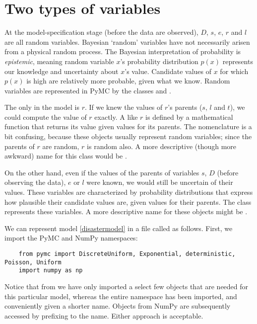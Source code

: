\section{Two types of variables}

At the model-specification stage (before the data are observed), $D$, $s$, $e$, $r$ and $l$ are all random variables. Bayesian `random' variables have not necessarily arisen from a physical random process. The Bayesian interpretation of probability is \emph{epistemic}, meaning random variable $x$'s probability distribution $p(x)$ represents our knowledge and uncertainty about $x$'s value. Candidate values of $x$ for which $p(x)$ is high are relatively more probable, given what we know. Random variables are represented in PyMC by the classes  and . 

The only  in the model is $r$. If we knew the values of $r$'s parents ($s$, $l$ and $t$), we could compute the value of $r$ exactly. A  like $r$ is defined by a mathematical function that returns its value given values for its parents. The nomenclature is a bit confusing, because these objects usually represent random variables; since the parents of $r$ are random, $r$ is random also. A more descriptive (though more awkward) name for this class would be .

On the other hand, even if the values of the parents of variables $s$, $D$ (before observing the data), $e$ or $l$ were known, we would still be uncertain of their values. These variables are characterized by probability distributions that express how plausible their candidate values are, given values for their parents. The  class represents these variables. A more descriptive name for these objects might be .

We can represent model \ref{disastermodel} in a file called  as follows. First, we import the PyMC and NumPy namespaces:
\begin{verbatim}
	from pymc import DiscreteUniform, Exponential, deterministic, Poisson, Uniform
	import numpy as np
\end{verbatim}
Notice that from  we have only imported a select few objects that are needed for this particular model, whereas the entire  namespace has been imported, and conveniently given a shorter name. Objects from NumPy are subsequently accessed by prefixing  to the name. Either approach is acceptable.

